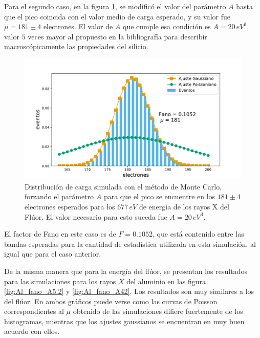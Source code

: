 \noindent Para el segundo caso, en la figura \ref{fig:F_fano_A20}, se modificó el valor del parámetro $A$ hasta que el pico coincida con el valor medio de carga esperado, y su valor fue $\mu = 181 \pm 4$ electrones. El valor de $A$ que cumple esa condición es $A = 20\,\si{eV}^{3}$, valor $5$ veces mayor al propuesto en la bibliografía para describir macroscópicamente las propiedades del silicio.
\begin{figure}%
    \centering
    \includegraphics[scale=0.5]{Figs/F_Fano_E677_A20_Eloss0_100ktrials.pdf}
    \caption{\footnotesize{Distribución de carga simulada con el método de Monte Carlo, forzando el parámetro $A$ para que el pico se encuentre en los $181 \pm 4$ electrones esperados para los $677\,\si{eV}$ de energía de los rayos X del Flúor. El valor necesario para esto suceda fue $A=20\,\si{eV}^{3}$.}}
    \label{fig:F_fano_A20}
\end{figure}
El factor de Fano en este caso es de $F = 0.1052$, que está contenido entre las bandas esperadas para la cantidad de estadística utilizada en esta simulación, al igual que para el caso anterior.

De la misma manera que para la energía del flúor, se presentan los resultados para las simulaciones para los rayos $X$ del aluminio en las figura \ref{fig:Al_fano_A5.2} y \ref{fig:Al_fano_A42}. Los resultados son muy similares a los del flúor. En ambos gráficos puede verse como las curvas de Poisson correspondientes al $\mu$ obtenido de las simulaciones difiere fuertemente de los histogramas, mientras que los ajustes gaussianos se encuentran en muy buen acuerdo con ellos. 

